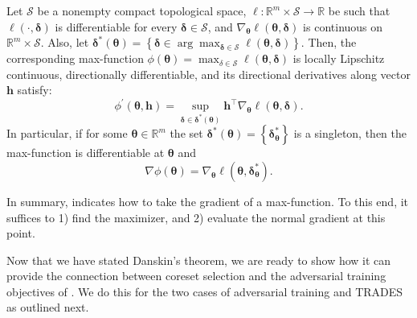 \documentclass[runningheads]{llncs}
\begin{document}
\begin{theorem}\label{danskin_theorem}
	Let $\mathcal{S}$ be a nonempty compact topological space, $\ell: \mathbb{R}^{m} \times \mathcal{S} \rightarrow \mathbb{R}$ be such that $\ell(\cdot, \boldsymbol{\delta})$ is differentiable for every $\boldsymbol{\delta} \in \mathcal{S}$, and $\nabla_{\boldsymbol{\theta}} \ell(\boldsymbol{\theta}, \boldsymbol{\delta})$ is continuous on $\mathbb{R}^{m} \times \mathcal{S}$.
	Also, let ${\boldsymbol{\delta}^{*}(\boldsymbol{\theta})=\left\{\boldsymbol{\delta} \in \arg \max _{\boldsymbol{\delta} \in \mathcal{S}} \ell(\boldsymbol{\theta}, \boldsymbol{\delta})\right\}}$.
	Then, the corresponding max-function $\phi(\boldsymbol{\theta})=\max _{\delta \in \mathcal{S}} \ell(\boldsymbol{\theta}, \boldsymbol{\delta})$ is locally Lipschitz continuous, directionally differentiable, and its directional derivatives along vector $\boldsymbol{h}$ satisfy:
	$$
	\phi^{\prime}(\boldsymbol{\theta}, \boldsymbol{h})=\sup _{\boldsymbol{\delta} \in \boldsymbol{\delta}^{*}(\boldsymbol{\theta})} \boldsymbol{h}^{\top} \nabla_{\boldsymbol{\theta}} \ell(\boldsymbol{\theta}, \boldsymbol{\delta}).
	$$
	In particular, if for some $\boldsymbol{\theta} \in \mathbb{R}^{m}$ the set $\boldsymbol{\delta}^{*}(\boldsymbol{\theta})=\left\{\boldsymbol{\delta}_{\boldsymbol{\theta}}^{*}\right\}$ is a singleton, then the max-function is differentiable at $\boldsymbol{\theta}$ and
	$$
	\nabla \phi(\boldsymbol{\theta})=\nabla_{\boldsymbol{\theta}} \ell\left(\boldsymbol{\theta}, \boldsymbol{\delta}_{\boldsymbol{\theta}}^{*}\right).
	$$
\end{theorem}

In summary,  indicates how to take the gradient of a max-function.
To this end, it suffices to 1) find the maximizer, and 2) evaluate the normal gradient at this point.

Now that we have stated Danskin's theorem, we are ready to show how it can provide the connection between coreset selection and the adversarial training objectives of .
We do this for the two cases of adversarial training and TRADES as outlined next.
\end{document}
